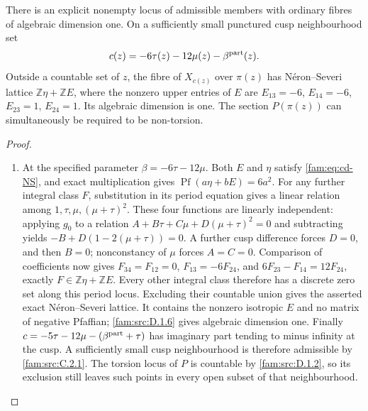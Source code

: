 \begin{proposition}\hypertarget{tag-01QX}{}\label{fam:src:D.1.7}\label{fam:st:D.1.7}

There is an explicit nonempty locus of admissible members with ordinary
fibres of algebraic dimension one. On a sufficiently small punctured
cusp neighbourhood set
\[
 c(z)=-6\tau(z)-12\mu(z)-\beta^{\rm part}(z).
\]
Outside a countable set of $z$, the fibre of $X_{c(z)}$ over $\pi(z)$ has
N\'eron--Severi lattice $\mathbb Z\eta+\mathbb ZE$, where the nonzero upper
entries of $E$ are
$E_{13}=-6$, $E_{14}=-6$, $E_{23}=1$, $E_{24}=1$.
Its algebraic dimension is one. The section $P(\pi(z))$ can simultaneously
be required to be non-torsion.
\end{proposition}


\begin{proof}
\begin{enumerate}[label=\arabic*.,leftmargin=*]
\item At the specified parameter $\beta=-6\tau-12\mu$. Both $E$ and $\eta$
satisfy \eqref{fam:eq:cd-NS}, and exact multiplication gives
$\operatorname{Pf}(a\eta+bE)=6a^2$.
For any further integral class $F$, substitution in its period equation
gives a linear relation among $1,\tau,\mu,(\mu+\tau)^2$.
These four functions are linearly independent: applying $g_0$ to a
relation $A+B\tau+C\mu+D(\mu+\tau)^2=0$ and subtracting yields
$-B+D(1-2(\mu+\tau))=0$. A further cusp difference forces $D=0$,
and then $B=0$; nonconstancy of $\mu$ forces $A=C=0$.
Comparison of coefficients now gives
$F_{34}=F_{12}=0$, $F_{13}=-6F_{24}$, and
$6F_{23}-F_{14}=12F_{24}$, exactly
$F\in\mathbb Z\eta+\mathbb ZE$. Every other integral class therefore
has a discrete zero set along this period locus. Excluding their
countable union gives the asserted exact N\'eron--Severi lattice.
It contains the nonzero isotropic $E$ and no matrix of negative
Pfaffian; \ref{fam:src:D.1.6} gives algebraic dimension one.
Finally
$c=-5\tau-12\mu-(\beta^{\rm part}+\tau)$ has imaginary part tending
to minus infinity at the cusp. A sufficiently small cusp neighbourhood
is therefore admissible by \ref{fam:src:C.2.1}. The torsion locus of $P$ is countable
by \ref{fam:src:D.1.2}, so its exclusion still leaves such points in every open subset
of that neighbourhood.
\end{enumerate}
\end{proof}